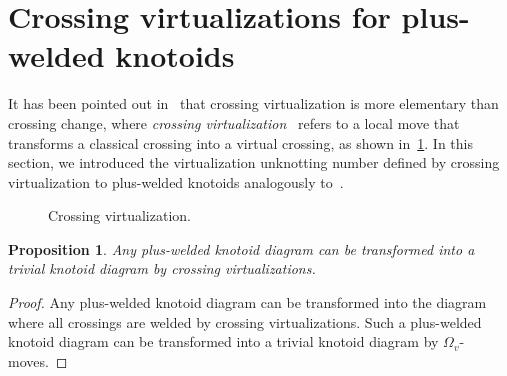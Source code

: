 \documentclass[11pt]{amsart}
\theoremstyle{noparens}
\newtheorem{proposition}{Proposition}[section]
\numberwithin{equation}{section}
\numberwithin{equation}{section}
\begin{document}
\section{Crossing virtualizations for plus-welded  knotoids} \label{section6}

It has been pointed out in~\citep{Goussarov2000Finite} that crossing virtualization is more elementary than crossing change, where \textit{crossing virtualization}~\citep{Miyazawa2020Generalized} refers to a local move that transforms a classical crossing into a virtual crossing, as shown in~\cref{Figure 25}.
In this section, we introduced the virtualization unknotting number defined by crossing virtualization to plus-welded  knotoids analogously to~\citep{Gill2021UnknottingInvariant}. 
\begin{figure}[htbp]
\begin{center}
\caption{Crossing virtualization.}	
\label{Figure 25}
\end{center}
\end{figure}

\begin{proposition} \label{Proposition 6.1}
Any plus-welded knotoid diagram can be transformed into a trivial knotoid diagram by crossing virtualizations.
\end{proposition}

\begin{proof}
Any plus-welded knotoid diagram can be transformed into the diagram where all crossings are welded by crossing virtualizations. Such a plus-welded knotoid diagram can be transformed into a trivial knotoid diagram by $\Omega_v$-moves.
\end{proof}
\end{document}

